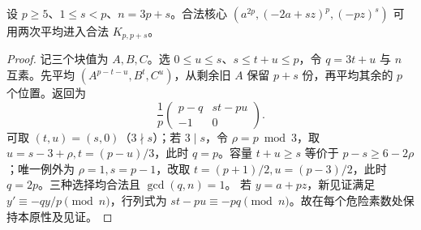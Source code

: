 \begin{lemma}[用两次平均改换块重数]\label{lem:shape-change}
设 $p\ge5$、$1\le s<p$、$n=3p+s$。合法核心 $(a^{2p},(-2a+sz)^p,(-pz)^s)$ 可用两次平均进入合法 $K_{p,p+s}$。
\end{lemma}
\begin{proof}
记三个块值为 $A,B,C$。选 $0\le u\le s$、$s\le t+u\le p$，令 $q=3t+u$ 与 $n$ 互素。先平均 $(A^{p-t-u},B^t,C^u)$，从剩余旧 $A$ 保留 $p+s$ 份，再平均其余的 $p$ 个位置。返回为
\[
\frac1p\begin{pmatrix}p-q&st-pu\\-1&0\end{pmatrix}.
\]
可取 $(t,u)=(s,0)$（$3\nmid s$）；若 $3\mid s$，令 $\rho=p\bmod3$，取 $u=s-3+\rho,t=(p-u)/3$，此时 $q=p$。容量 $t+u\ge s$ 等价于 $p-s\ge6-2\rho$；唯一例外为 $\rho=1,s=p-1$，改取 $t=(p+1)/2,u=(p-3)/2$，此时 $q=2p$。三种选择均合法且 $\gcd(q,n)=1$。
若 $y=a+pz$，新见证满足 $y'\equiv-qy/p\pmod n$，行列式为 $st-pu\equiv-pq\pmod n$。故在每个危险素数处保持本原性及见证。
\end{proof}

